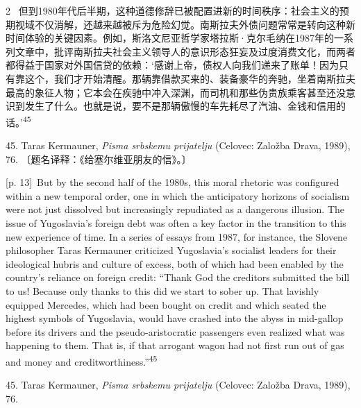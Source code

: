 \documentclass[10pt,a4paper]{article}
\begin{document}
\begin{paracol}{2}
\switchcolumn*
{\scriptsize\color{gray} [p. 13]}\ 但到1980年代后半期，这种道德修辞已被配置进新的时间秩序：社会主义的预期视域不仅消解，还越来越被斥为危险幻觉。南斯拉夫外债问题常常是转向这种新时间体验的关键因素。例如，斯洛文尼亚哲学家塔拉斯·克尔毛纳在1987年的一系列文章中，批评南斯拉夫社会主义领导人的意识形态狂妄及过度消费文化，而两者都得益于国家对外国信贷的依赖：‘感谢上帝，债权人向我们递来了账单！因为只有靠这个，我们才开始清醒。那辆靠借款买来的、装备豪华的奔驰，坐着南斯拉夫最高的象征人物；它本会在疾驰中冲入深渊，而司机和那些伪贵族乘客甚至还没意识到发生了什么。也就是说，要不是那辆傲慢的车先耗尽了汽油、金钱和信用的话。’\nobreak\textsuperscript{45}\par{\small 45. Taras Kermauner, \textit{Pisma srbskemu prijatelju} (Celovec: Založba Drava, 1989), 76. 〔题名译释：《给塞尔维亚朋友的信》。〕\par}
\switchcolumn
{\scriptsize\color{gray} [p. 13]}\ But by the second half of the 1980s, this moral rhetoric was configured within a new temporal order, one in which the anticipatory horizons of socialism were not just dissolved but increasingly repudiated as a dangerous illusion. The issue of Yugoslavia’s foreign debt was often a key factor in the transition to this new experience of time. In a series of essays from 1987, for instance, the Slovene philosopher Taras Kermauner criticized Yugoslavia’s socialist leaders for their ideological hubris and culture of excess, both of which had been enabled by the country’s reliance on foreign credit: “Thank God the creditors submitted the bill to us! Because only thanks to this did we start to sober up. That lavishly equipped Mercedes, which had been bought on credit and which seated the highest symbols of Yugoslavia, would have crashed into the abyss in mid-gallop before its drivers and the pseudo-aristocratic passengers even realized what was happening to them. That is, if that arrogant wagon had not first run out of gas and money and creditworthiness.”\nobreak\textsuperscript{45}\par{\small 45. Taras Kermauner, \textit{Pisma srbskemu prijatelju} (Celovec: Založba Drava, 1989), 76.\par}
\switchcolumn*

\end{paracol}
\end{document}
